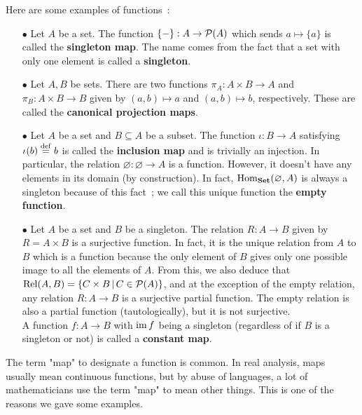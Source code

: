 \begin{example}
	Here are some examples of functions~:
	\\

	\begin{itemize}
		\item[$\bullet$] Let $A$ be a set. The function $\{-\} : A \to \operatorname{\mathcal P}(A)$ which sends $a \mapsto \{a\}$ is called the \textbf{singleton map}. The name comes from the fact that a set with only one element is called a \textbf{singleton}.
		\\

		\item[$\bullet$] Let $A,B$ be sets. There are two functions $\pi_A : A \times B \to A$ and $\pi_B : A \times B \to B$ given by $(a,b) \mapsto a$ and $(a,b) \mapsto b$, respectively. These are called the \textbf{canonical projection maps}.
		\\

		\item[$\bullet$] Let $A$ be a set and $B \subseteq A$ be a subset. The function $\iota : B \to A$ satisfying $\iota(b) \overset{\mathrm{def}}{=} b$ is called the \textbf{inclusion map} and is trivially an injection. In particular, the relation $\varnothing : \varnothing \to A$ is a function. However, it doesn't have any elements in its domain (by construction). In fact, $\mathrm{Hom}_{\mathbf{Set}}(\varnothing,A)$ is always a singleton because of this fact~; we call this unique function the \textbf{empty function}.
		\\

		\item[$\bullet$] Let $A$ be a set and $B$ be a singleton. The relation $R : A \to B$ given by $R = A \times B$ is a surjective function. In fact, it is the unique relation from $A$ to $B$ which is a function because the only element of $B$ gives only one possible image to all the elements of $A$. From this, we also deduce that $\mathrm{Rel}(A,B) = \{ C \times B \, | \, C \in \operatorname{\mathcal P}(A) \}$, and at the exception of the empty relation, any relation $R : A \to B$ is a surjective partial function. The empty relation is also a partial function (tautologically), but it is not surjective.
		\\
		
		A function $f : A \to B$ with $\operatorname{\mathrm{im}} f$ being a singleton (regardless of if $B$ is a singleton or not) is called a \textbf{constant map}.
	\end{itemize}
\end{example}

\begin{remark}
	The term "map" to designate a function is common. In real analysis, maps usually mean continuous functions, but by abuse of languages, a lot of mathematicians use the term "map" to mean other things. This is one of the reasons we gave some examples.
\end{remark}